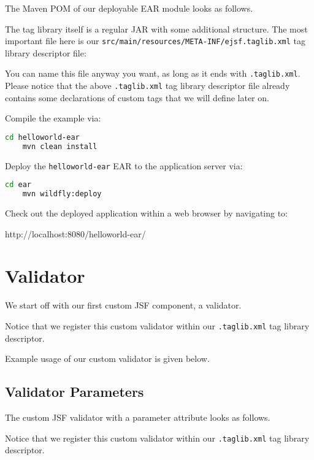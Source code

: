 The Maven POM of our deployable EAR module looks as follows.


The tag library itself is a regular JAR with some additional structure.
The most important file here is our \texttt{src/main/resources/META-INF/ejsf.taglib.xml} tag library descriptor file:

You can name this file anyway you want, as long as it ends with \texttt{.taglib.xml}.
Please notice that the above \texttt{.taglib.xml} tag library descriptor file already contains some declarations of custom tags that we will define later on.

Compile the example via:
\begin{lstlisting}[language=bash]
	cd helloworld-ear
	mvn clean install
\end{lstlisting}

Deploy the \texttt{helloworld-ear} EAR to the application server via:
\begin{lstlisting}[language=bash]
	cd ear
	mvn wildfly:deploy
\end{lstlisting}

Check out the deployed application within a web browser by navigating to:

http://localhost:8080/helloworld-ear/

\section{Validator}

We start off with our first custom JSF component, a validator.

Notice that we register this custom validator within our \texttt{.taglib.xml} tag library descriptor.

Example usage of our custom validator is given below.


\subsection{Validator Parameters}

The custom JSF  validator with a parameter attribute looks as follows.

Notice that we register this custom validator within our \texttt{.taglib.xml} tag library descriptor.

